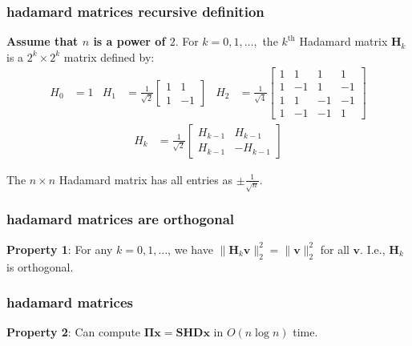 \documentclass[compress]{beamer}
\newcommand{\bs}[1]{\boldsymbol{#1}}
\newcommand{\bv}[1]{\mathbf{#1}}
\begin{document}
\begin{frame}[t]
	\frametitle{hadamard matrices recursive definition}
	\textbf{Assume that $n$ is a power of $2$}. For $k = 0, 1, \ldots,$ the $k^\text{th}$ {Hadamard matrix} $\bv{H}_k$ is a $2^k \times 2^k$ matrix defined by:
	\begin{align*}
	H_0 &= 1 
	& H_1 &= \frac{1}{\sqrt{2}}\begin{bmatrix}1 & 1 \\ 1& -1 \end{bmatrix} 
	& H_2 &= \frac{1}{\sqrt{4}}\begin{bmatrix}1 & 1 & 1& 1 \\ 1 & -1 & 1& -1 \\ 1 & 1 & -1& -1 \\1 & -1 & -1& 1  \end{bmatrix} 
	\end{align*}
	\begin{align*}
	H_k &= \frac{1}{\sqrt{2}}\begin{bmatrix}H_{k-1} & H_{k-1}  \\ H_{k-1} & -H_{k-1}  \end{bmatrix}
	\end{align*}
	\begin{center}
		The $n\times n$ Hadamard matrix has all entries as $\pm \frac{1}{\sqrt{n}}$. 
	\end{center}
\end{frame}

\begin{frame}[t]
	\frametitle{hadamard matrices are orthogonal}
	\textbf{Property 1}: For any $k = 0, 1, \ldots$, we have $\|\bv{H}_k\bv{v}\|_2^2 = \|\bv{v}\|_2^2$ for all $\bv{v}$. I.e., $\bv{H}_k$ is orthogonal.
	
	
\end{frame}

\begin{frame}[t]
	\frametitle{hadamard matrices}
	\textbf{Property 2}: Can compute $\bs{\Pi}\bv{x} = \bv{SHD}\bv{x}$ in $O(n\log n)$ time. 
	\vspace{14em}

\end{frame}
\end{document}
